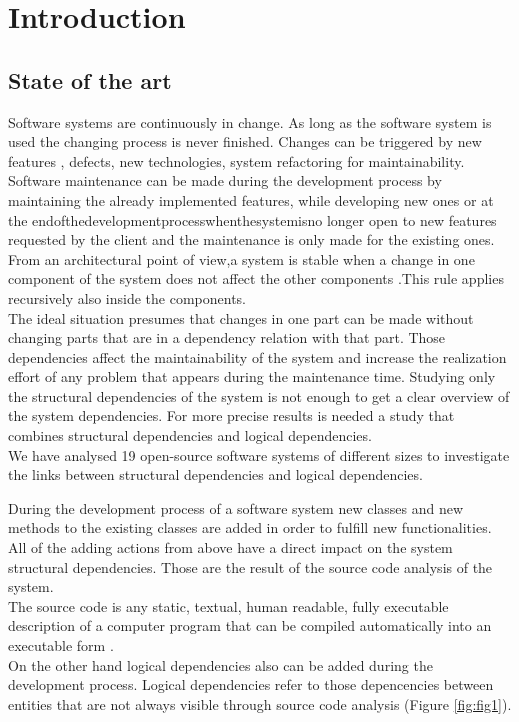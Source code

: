 \chapter{Introduction}

\section {State of the art}
\tab Software systems are continuously in change. As long as the software system is used the changing process is never ﬁnished. Changes can be triggered by new features , defects, new technologies, system refactoring for maintainability.\\ Software maintenance can be made during the development process by maintaining the already implemented features, while developing new ones or at the endofthedevelopmentprocesswhenthesystemisno longer open to new features requested by the client and the maintenance is only made for the existing ones. From an architectural point of view,a system is stable when a change in one component of the system does not aﬀect the other components .This rule applies recursively also inside the components.\\ 
\tab The ideal situation presumes that changes in one part can be made without changing parts that are in a dependency relation with that part. Those dependencies aﬀect the maintainability of the system and increase the realization eﬀort of any problem that appears during the maintenance time. Studying only the structural dependencies of the system is not enough to get a clear overview of the system dependencies. For more precise results is needed a study that combines structural dependencies and logical dependencies. \\ We have analysed 19 open-source software systems of diﬀerent sizes to investigate the links between structural dependencies and logical dependencies. 


\tab During the development process of a software system new classes and new methods to the existing classes are added in order to fulﬁll new functionalities. All of the adding actions from above have a direct impact on the system structural dependencies. Those are the result of the source code analysis of the system. \\The source code is any static, textual, human readable, fully executable description of a computer program that can be compiled automatically into an executable form \cite{ct1}.\\On the other hand logical dependencies also can be added during the development process. Logical dependencies refer to those depencencies between entities that are not always visible through source code analysis (Figure \ref{fig:fig1}).

